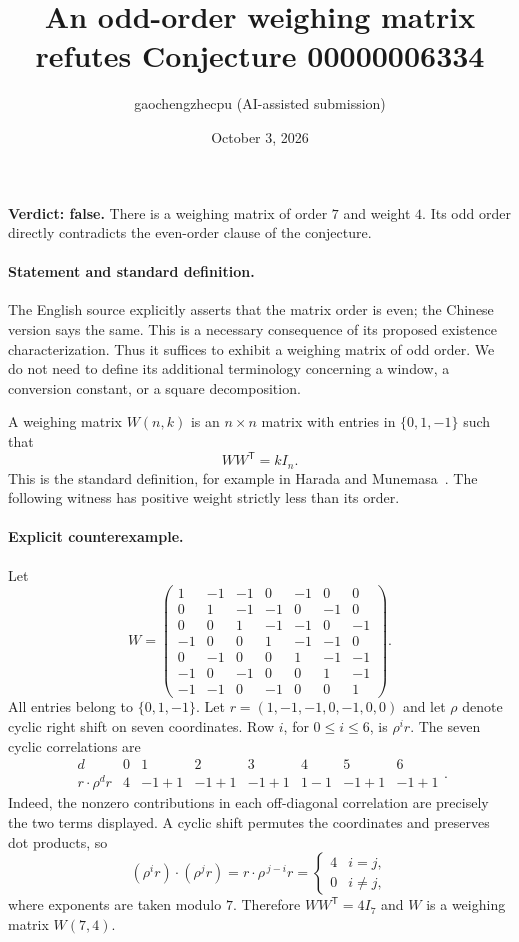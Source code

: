 \documentclass[10pt]{article}
\title{An odd-order weighing matrix refutes Conjecture 00000006334}
\author{gaochengzhecpu (AI-assisted submission)}
\date{October 3, 2026}
\makeatletter
\renewcommand{\maketitle}{\begin{center}
{\Large\bfseries\@title\par}\vspace{0.6em}
{\small\@author\par\@date}
\end{center}\vspace{0.5em}}
\makeatother
\begin{document}
\maketitle

\noindent\textbf{Verdict: false.} There is a weighing matrix of order $7$ and weight $4$. Its odd order directly contradicts the even-order clause of the conjecture.

\paragraph{Statement and standard definition.}
The English source explicitly asserts that the matrix order is even; the Chinese version says the same. This is a necessary consequence of its proposed existence characterization. Thus it suffices to exhibit a weighing matrix of odd order. We do not need to define its additional terminology concerning a window, a conversion constant, or a square decomposition.

A weighing matrix $W(n,k)$ is an $n\times n$ matrix with entries in $\{0,1,-1\}$ such that
\[
WW^{\mathsf T}=kI_n.
\]
This is the standard definition, for example in Harada and Munemasa~\cite{HM}. The following witness has positive weight strictly less than its order.

\paragraph{Explicit counterexample.}
Let
\[
W=\begin{pmatrix}
 1&-1&-1& 0&-1& 0& 0\\
 0& 1&-1&-1& 0&-1& 0\\
 0& 0& 1&-1&-1& 0&-1\\
-1& 0& 0& 1&-1&-1& 0\\
 0&-1& 0& 0& 1&-1&-1\\
-1& 0&-1& 0& 0& 1&-1\\
-1&-1& 0&-1& 0& 0& 1
\end{pmatrix}.
\]
All entries belong to $\{0,1,-1\}$. Let $r=(1,-1,-1,0,-1,0,0)$ and let $\rho$ denote cyclic right shift on seven coordinates. Row $i$, for $0\le i\le6$, is $\rho^i r$. The seven cyclic correlations are
\[
\begin{array}{c|rrrrrrr}
d&0&1&2&3&4&5&6\\ \hline
r\cdot\rho^d r&4&-1+1&-1+1&-1+1&1-1&-1+1&-1+1
\end{array}.
\]
Indeed, the nonzero contributions in each off-diagonal correlation are precisely the two terms displayed. A cyclic shift permutes the coordinates and preserves dot products, so
\[
(\rho^i r)\cdot(\rho^j r)=r\cdot\rho^{\,j-i}r
 =\begin{cases}4&i=j,\\0&i\ne j,\end{cases}
\]
where exponents are taken modulo $7$. Therefore $WW^{\mathsf T}=4I_7$ and $W$ is a weighing matrix $W(7,4)$.
\end{document}
